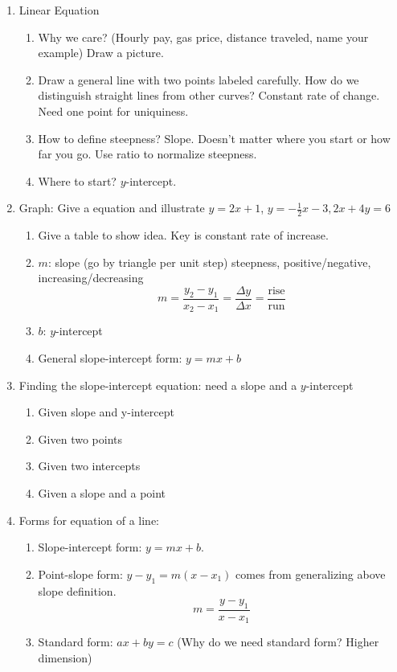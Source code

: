 \documentclass{article}
\begin{document}
\begin{enumerate}
\item Linear Equation
\begin{enumerate}
\item Why we care? (Hourly pay, gas price, distance traveled, name your example) Draw a picture.
\item Draw a general line with two points labeled carefully. How do we distinguish straight lines from other curves? Constant rate of change. Need one point for uniquiness.
\item How to define steepness? Slope. Doesn't matter where you start or how far you go. Use ratio to normalize steepness.
\item Where to start? $y$-intercept.
\end{enumerate}

\item Graph: Give a equation and illustrate $y=2x+1$, $y=-\frac{1}{2}x-3, 2x+4y=6$
\begin{enumerate}
\item Give a table to show idea. Key is constant rate of increase.
\item $m$: slope (go by triangle per unit step) steepness, positive/negative, increasing/decreasing
\[
m = \frac{y_2-y_1}{x_2-x_1} = \frac{\Delta y}{\Delta x} = \frac{\text{rise}}{\text{run}}
\]
\item $b$: $y$-intercept
\item General slope-intercept form: $y=mx+b$
\end{enumerate}

\item Finding the slope-intercept equation: need a slope and a $y$-intercept
\begin{enumerate}
\item Given slope and y-intercept
\item Given two points
\item Given two intercepts
\item Given a slope and a point
\end{enumerate}

\item Forms for equation of a line:
\begin{enumerate}
\item Slope-intercept form: $y=mx+b$.
\item Point-slope form: $y-y_1 = m(x-x_1)$ comes from generalizing above slope definition.
\[
m = \frac{y-y_1}{x-x_1}
\]
\item Standard form: $ax+by=c$ (Why do we need standard form? Higher dimension)
\end{enumerate}


\end{enumerate}
\end{document}
